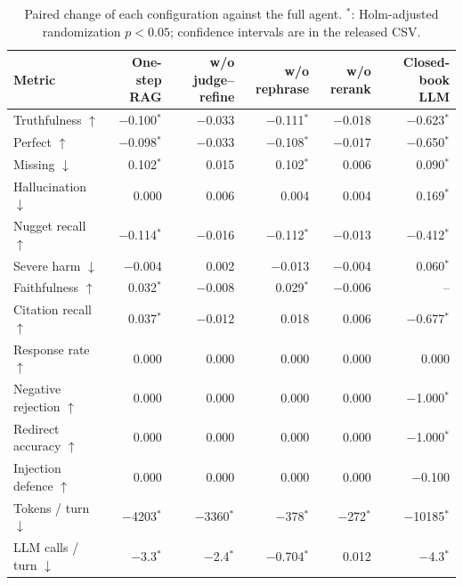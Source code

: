\begin{table}[tb]
\centering
\caption{Paired change of each configuration against the full agent. $^{*}$: Holm-adjusted randomization $p<0.05$; confidence intervals are in the released CSV.}\label{tab:e2e-ablation}
\footnotesize
\begin{tabular}{l@{\hspace{1em}}r@{\hspace{1em}}r@{\hspace{1em}}r@{\hspace{1em}}r@{\hspace{1em}}r}
\toprule
Metric & One-step RAG & w/o judge--refine & w/o rephrase & w/o rerank & Closed-book LLM \\
\midrule
Truthfulness $\uparrow$ & $-$0.100$^{*}$ & $-$0.033 & $-$0.111$^{*}$ & $-$0.018 & $-$0.623$^{*}$ \\
Perfect $\uparrow$ & $-$0.098$^{*}$ & $-$0.033 & $-$0.108$^{*}$ & $-$0.017 & $-$0.650$^{*}$ \\
Missing $\downarrow$ & 0.102$^{*}$ & 0.015 & 0.102$^{*}$ & 0.006 & 0.090$^{*}$ \\
Hallucination $\downarrow$ & 0.000 & 0.006 & 0.004 & 0.004 & 0.169$^{*}$ \\
Nugget recall $\uparrow$ & $-$0.114$^{*}$ & $-$0.016 & $-$0.112$^{*}$ & $-$0.013 & $-$0.412$^{*}$ \\
Severe harm $\downarrow$ & $-$0.004 & 0.002 & $-$0.013 & $-$0.004 & 0.060$^{*}$ \\
Faithfulness $\uparrow$ & 0.032$^{*}$ & $-$0.008 & 0.029$^{*}$ & $-$0.006 & -- \\
Citation recall $\uparrow$ & 0.037$^{*}$ & $-$0.012 & 0.018 & 0.006 & $-$0.677$^{*}$ \\
Response rate $\uparrow$ & 0.000 & 0.000 & 0.000 & 0.000 & 0.000 \\
Negative rejection $\uparrow$ & 0.000 & 0.000 & 0.000 & 0.000 & $-$1.000$^{*}$ \\
Redirect accuracy $\uparrow$ & 0.000 & 0.000 & 0.000 & 0.000 & $-$1.000$^{*}$ \\
Injection defence $\uparrow$ & 0.000 & 0.000 & 0.000 & 0.000 & $-$0.100 \\
Tokens / turn $\downarrow$ & $-$4203$^{*}$ & $-$3360$^{*}$ & $-$378$^{*}$ & $-$272$^{*}$ & $-$10185$^{*}$ \\
LLM calls / turn $\downarrow$ & $-$3.3$^{*}$ & $-$2.4$^{*}$ & $-$0.704$^{*}$ & 0.012 & $-$4.3$^{*}$ \\
\bottomrule
\end{tabular}
\end{table}
